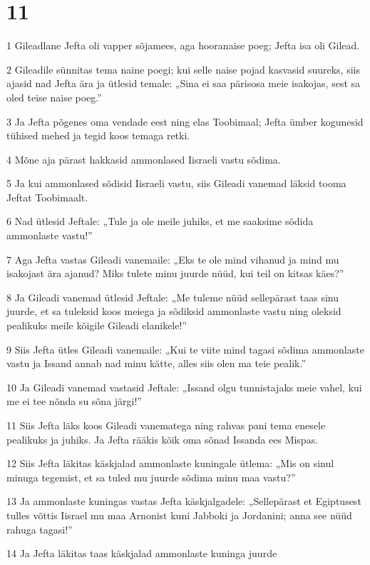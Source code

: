 \chapter{11}

\par 1 Gileadlane Jefta oli vapper sõjamees, aga hooranaise poeg; Jefta isa oli Gilead.
\par 2 Gileadile sünnitas tema naine poegi; kui selle naise pojad kasvasid suureks, siis ajasid nad Jefta ära ja ütlesid temale: „Sina ei saa pärisosa meie isakojas, sest sa oled teise naise poeg.”
\par 3 Ja Jefta põgenes oma vendade eest ning elas Toobimaal; Jefta ümber kogunesid tühised mehed ja tegid koos temaga retki.
\par 4 Mõne aja pärast hakkasid ammonlased Iisraeli vastu sõdima.
\par 5 Ja kui ammonlased sõdisid Iisraeli vastu, siis Gileadi vanemad läksid tooma Jeftat Toobimaalt.
\par 6 Nad ütlesid Jeftale: „Tule ja ole meile juhiks, et me saaksime sõdida ammonlaste vastu!”
\par 7 Aga Jefta vastas Gileadi vanemaile: „Eks te ole mind vihanud ja mind mu isakojast ära ajanud? Miks tulete minu juurde nüüd, kui teil on kitsas käes?”
\par 8 Ja Gileadi vanemad ütlesid Jeftale: „Me tuleme nüüd sellepärast taas sinu juurde, et sa tuleksid koos meiega ja sõdiksid ammonlaste vastu ning oleksid pealikuks meile kõigile Gileadi elanikele!”
\par 9 Siis Jefta ütles Gileadi vanemaile: „Kui te viite mind tagasi sõdima ammonlaste vastu ja Issand annab nad minu kätte, alles siis olen ma teie pealik.”
\par 10 Ja Gileadi vanemad vastasid Jeftale: „Issand olgu tunnistajaks meie vahel, kui me ei tee nõnda su sõna järgi!”
\par 11 Siis Jefta läks koos Gileadi vanematega ning rahvas pani tema enesele pealikuks ja juhiks. Ja Jefta rääkis kõik oma sõnad Issanda ees Mispas.
\par 12 Siis Jefta läkitas käskjalad ammonlaste kuningale ütlema: „Mis on sinul minuga tegemist, et sa tuled mu juurde sõdima minu maa vastu?”
\par 13 Ja ammonlaste kuningas vastas Jefta käskjalgadele: „Sellepärast et Egiptusest tulles võttis Iisrael mu maa Arnonist kuni Jabboki ja Jordanini; anna see nüüd rahuga tagasi!”
\par 14 Ja Jefta läkitas taas käskjalad ammonlaste kuninga juurde
